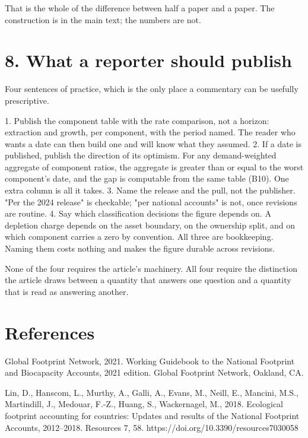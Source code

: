 \documentclass[11pt]{article}
\begin{document}
That is the whole of the difference between half a paper and a paper. The construction is in the main text; the numbers are not.

\vspace{0.8em}

\section*{8. What a reporter should publish}\label{8-what-a-reporter-should-publish}

Four sentences of practice, which is the only place a commentary can be usefully prescriptive.

1. Publish the component table with the rate comparison, not a horizon: extraction and growth, per component, with the period named. The reader who wants a date can then build one and will know what they assumed. 2. If a date is published, publish the direction of its optimism. For any demand-weighted aggregate of component ratios, the aggregate is greater than or equal to the worst component's date, and the gap is computable from the same table (B10). One extra column is all it takes. 3. Name the release and the pull, not the publisher. "Per the 2024 release" is checkable; "per national accounts" is not, once revisions are routine. 4. Say which classification decisions the figure depends on. A depletion charge depends on the asset boundary, on the ownership split, and on which component carries a zero by convention. All three are bookkeeping. Naming them costs nothing and makes the figure durable across revisions.

None of the four requires the article's machinery. All four require the distinction the article draws between a quantity that answers one question and a quantity that is read as answering another.

\vspace{0.8em}

\section*{References}\label{references}

Global Footprint Network, 2021. Working Guidebook to the National Footprint and Biocapacity Accounts, 2021 edition. Global Footprint Network, Oakland, CA.

Lin, D., Hanscom, L., Murthy, A., Galli, A., Evans, M., Neill, E., Mancini, M.S., Martindill, J., Medouar, F.-Z., Huang, S., Wackernagel, M., 2018. Ecological footprint accounting for countries: Updates and results of the National Footprint Accounts, 2012--2018. Resources 7, 58. https://doi.org/10.3390/resources7030058
\end{document}
